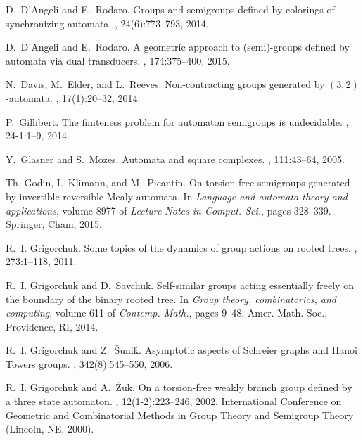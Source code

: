 \documentclass{amsart}
\begin{document}
{\begin{thebibliography}{10}
D.~D'Angeli and E.~Rodaro.
\newblock Groups and semigroups defined by colorings of synchronizing automata.
,
  24(6):773--793, 2014.

D.~D'Angeli and E.~Rodaro.
\newblock A geometric approach to (semi)-groups defined by automata via dual
  transducers.
, 174:375--400, 2015.

N.~Davis, M.~Elder, and L.~Reeves.
\newblock Non-contracting groups generated by {$(3,2)$}-automata.
, 17(1):20--32, 2014.

P.~Gillibert.
\newblock The finiteness problem for automaton semigroups is undecidable.
, 24-1:1--9,
  2014.

Y.~Glasner and S.~Mozes.
\newblock Automata and square complexes.
, 111:43--64, 2005.

Th. Godin, I.~Klimann, and M.~Picantin.
\newblock On torsion-free semigroups generated by invertible reversible {M}ealy
  automata.
\newblock In {\em Language and automata theory and applications}, volume 8977
  of {\em Lecture Notes in Comput. Sci.}, pages 328--339. Springer, Cham, 2015.

R.~I. Grigorchuk.
\newblock Some topics of the dynamics of group actions on rooted trees.
, 273:1--118,
  2011.

R.~I. Grigorchuk and D.~Savchuk.
\newblock Self-similar groups acting essentially freely on the boundary of the
  binary rooted tree.
\newblock In {\em Group theory, combinatorics, and computing}, volume 611 of
  {\em Contemp. Math.}, pages 9--48. Amer. Math. Soc., Providence, RI, 2014.

R.~I. Grigorchuk and Z.~{\v{S}}uni{\'k}.
\newblock Asymptotic aspects of {S}chreier graphs and {H}anoi {T}owers groups.
,
  342(8):545--550, 2006.

R.~I. Grigorchuk and A.~{\.Z}uk.
\newblock On a torsion-free weakly branch group defined by a three state
  automaton.
,
  12(1-2):223--246, 2002.
\newblock International Conference on Geometric and Combinatorial Methods in
  Group Theory and Semigroup Theory (Lincoln, NE, 2000).


\end{thebibliography}}
\end{document}

